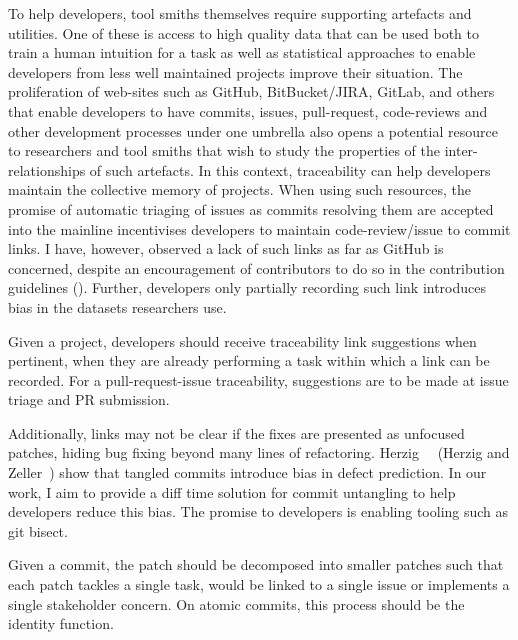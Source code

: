 To help developers, tool smiths themselves require supporting artefacts and
utilities. One of these is access to high quality data that can be used both to
train a human intuition for a task as well as statistical approaches to enable
developers from less well maintained projects improve their situation. The
proliferation of web-sites such as GitHub, BitBucket/JIRA, GitLab, and others
that enable developers to have commits, issues, pull-request, code-reviews and
other development processes under one umbrella also opens a potential resource
to researchers and tool smiths that wish to study the properties of the
inter-relationships of such artefacts. In this context, traceability can help
developers maintain the collective memory of projects. When using such
resources, the promise of automatic triaging of issues as commits resolving them
are accepted into the mainline incentivises developers to maintain
code-review/issue to commit links. I have, however, observed a lack of such
links as far as GitHub is concerned, despite an encouragement of contributors to
do so in the contribution guidelines (). Further,
developers only partially recording such link introduces bias in the datasets
researchers use.

\begin{tcolorbox}[title=Pull-request-Issue Traceability]
    Given a project, developers should receive traceability link suggestions
    when pertinent, \ie when they are already performing a task within which a
    link can be recorded. For a pull-request-issue traceability, suggestions are
    to be made at issue triage and PR submission.
\end{tcolorbox}

Additionally, links may not be clear if the fixes are presented as unfocused
patches, hiding bug fixing beyond many lines of refactoring.
Herzig~\etal~\cite{Herzig2016} (Herzig and Zeller~\cite{Herzig2013}) show that
tangled commits introduce bias in defect prediction. In our work, I aim to
provide a diff time solution for commit untangling to help developers reduce
this bias. The promise to developers is enabling tooling such as git bisect.

\begin{tcolorbox}[title=Commit Untangling]
    Given a commit, the patch should be decomposed into smaller patches such
    that each patch tackles a single task, \ie would be linked to a single issue
    or implements a single stakeholder concern. On atomic commits, this process
    should be the identity function.
\end{tcolorbox}

